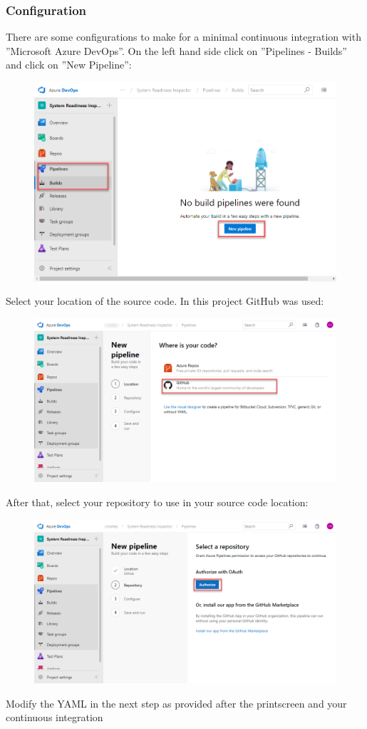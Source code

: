 \subsubsection{Configuration}
There are some configurations to make for a minimal continuous integration with ''Microsoft Azure DevOps''. On the left hand side click on ''Pipelines - Builds'' and click on ''New Pipeline'':
\begin{figure}[H]
    \centering
    \includegraphics[width=0.7\linewidth]{assets/devops1.png}
\end{figure}
Select your location of the source code. In this project GitHub was used:
\begin{figure}[H]
    \centering
    \includegraphics[width=0.7\linewidth]{assets/devops2.png}
\end{figure}
After that, select your repository to use in your source code location:
\begin{figure}[H]
    \centering
    \includegraphics[width=0.7\linewidth]{assets/devops3.png}
\end{figure}
Modify the YAML in the next step as provided after the printscreen and your continuous integration 

